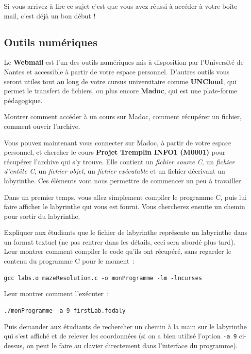 \documentclass[a4paper]{article}
\newenvironment{enseignants}[1]{\noindent\color{blue}{\bf #1}}{}
\begin{document}
Si vous arrivez à lire ce sujet c’est que vous avez réussi à accéder à votre boîte mail, c’est déjà un bon début !

\subsection{Outils numériques}

Le \textbf{Webmail} est l’un des outils numériques mis à disposition par l’Université de Nantes et accessible à partir de votre espace personnel. D’autres outils vous seront utiles tout au long de votre cursus universitaire comme \textbf{UNCloud}, qui permet le transfert de fichiers, ou plus encore \textbf{Madoc}, qui est une plate-forme pédagogique.

\begin{enseignants}{Madoc~:}
  Montrer comment accéder à un cours sur Madoc, comment récupérer un fichier, comment ouvrir l'archive.
\end{enseignants}

Vous pouvez maintenant vous connecter sur Madoc, à partir de votre espace personnel, et chercher le cours \textbf{Projet Tremplin INFO1 (M0001)} pour récupérer l'archive qui s'y trouve. Elle contient un \emph{fichier source C}, un \emph{fichier d'entête C}, un \emph{fichier objet}, un \emph{fichier exécutable} et un fichier décrivant un labyrinthe. Ces éléments vont nous permettre de commencer un peu à travailler.

Dans un premier temps, vous allez simplement compiler le programme C, puis lui faire afficher le labyrinthe qui vous est fourni.
Vous chercherez ensuite un chemin pour sortir du labyrinthe.

\begin{enseignants}{}
  Expliquer aux étudiants que le fichier de labyrinthe représente un labyrinthe dans un format textuel (ne pas rentrer dans les détails, ceci sera abordé plus tard).
  Leur montrer comment compiler le code qu'ils ont récupéré, sans regarder le contenu du programme C pour le moment~:

  \verb|gcc labs.o mazeResolution.c -o monProgramme -lm -lncurses|

  Leur montrer comment l'exécuter~:

  \verb|./monProgramme -a 9 firstLab.fodaly|

  Puis demander aux étudiants de rechercher un chemin à la main sur le labyrinthe qui s'est affiché et de relever les coordonnées (si on a bien utilisé l'option \verb|-a 9| ci-dessus, on peut le faire au clavier directement dans l'interface du programme).
\end{enseignants}
\end{document}

